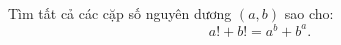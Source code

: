 \ifshowproblem
\begin{problem}\label{example:MEMO-2015-T-P7}
    Tìm tất cả các cặp số nguyên dương \( (a, b) \) sao cho:
    \[
        a! + b! = a^b + b^a.
    \]
\end{problem}
\fi

\fi
